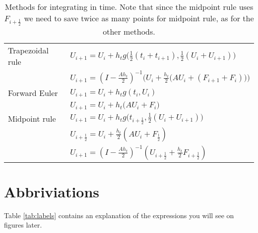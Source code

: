 \begin{table}
\begin{tabular}{l l}
	Trapezoidal rule \cite{trapezoidal} & $U_{i+1} = U_{i}+h_t g \Big( \frac{1}{2}(t_i+t_{i+1}),\frac{1}{2}(U_i+U_{i+1}) \Big)$
	\\ & $U_{i+1} = (I- \frac{A h_t}{2}) ^{-1} \Big(  U_i + \frac{h_t}{2} \big( A U_i+(F_{i+1}+F_i) \big)  \Big) $\\
\hline	
	Forward Euler \cite{forwardeuler} & $ U_{i+1} = U_i + h_t g ( t_i, U_i ) $ \\ & $ U_{i+1} = U_i + h_t \big( A U_i + F_i \big) $ \\
	\hline
	Midpoint rule \cite{midpoint} & $U_{i+1} = U_i + h_t g \Big(  t_{i+\frac{1}{2}} , \frac{1}{2}(U_i + U_{i+1})    \Big) $ \\ & 
	$U_{i+\frac{1}{2}} = U_i + \frac{h_t}{2} ( A U_i + F_{\frac{1}{2}} )$ \\ &
    $U_{i+1} = (I-\frac{A h_t}{2}) ^{-1} (U_{i+\frac{1}{2}} + \frac{h_t}{2} F_{i+ \frac{1}{2}})$
\end{tabular}

\caption{Methods for integrating in time. Note that since the midpoint rule uses $F_{i+\frac{1}{2}}$ we need to save twice as many points for midpoint rule, as for the other methods.} 
\label{tab:intmet}
\end{table}

\section{Abbriviations}%
Table \ref{tab:labels} contains an explanation of the expressions you will see on figures later.

